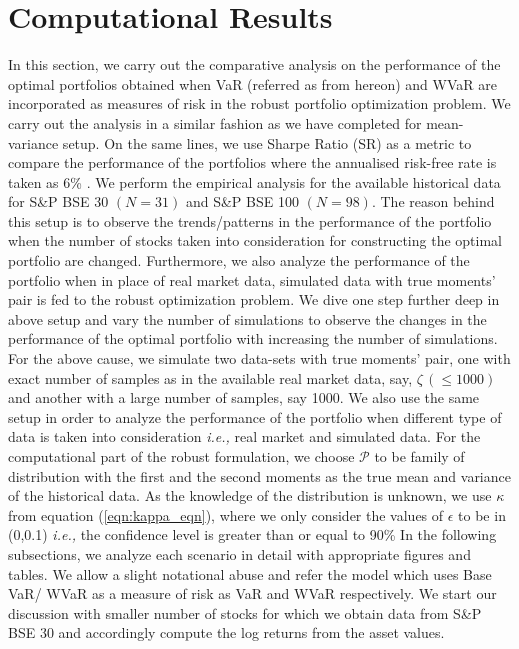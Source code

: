 \section{Computational Results}
In this section, we carry out the comparative analysis on the performance of the optimal portfolios obtained when VaR (referred as  from hereon) and WVaR are incorporated as measures of risk in the robust portfolio optimization problem. We carry out the analysis in a similar fashion as we have completed for mean-variance setup. On the same lines, we use Sharpe Ratio (SR) as a metric to compare the performance of the portfolios where the annualised risk-free rate is taken as 6\% \cite{rbi}. We perform the empirical analysis for the available historical data for S\&P BSE 30 $(N = 31)$ and S\&P BSE 100 $(N = 98)$. The reason behind this setup is to observe the trends/patterns in the performance of the portfolio when the number of stocks taken into consideration for constructing the optimal portfolio are changed. Furthermore, we also analyze the performance of the portfolio when in place of real market data, simulated data with true moments' pair is fed to the robust optimization problem. We dive one step further deep in above setup and vary the number of simulations to observe the changes in the performance of the optimal portfolio with increasing the number of simulations. For the above cause, we simulate two data-sets with true moments' pair, one with exact number of samples as in the available real market data, say, $\zeta \, (\leq 1000)$ and another with a large number of samples, say 1000. We also use the same setup in order to analyze the performance of the portfolio when different type of data is taken into consideration \textit{i.e.,} real market and simulated data. For the computational part of the robust formulation, we choose $\mathcal{P}$ to be family of distribution with the first and the second moments as the true mean and variance of the historical data. As the knowledge of the distribution is unknown, we use $\kappa$ from equation (\ref{eqn:kappa_eqn}), where we only consider the values of $\epsilon$ to be in (0,0.1) \textit{i.e.,} the confidence level is greater than or equal to 90\% In the following subsections, we analyze each scenario in detail with appropriate figures and tables. We allow a slight notational abuse and refer the model which uses Base VaR/ WVaR as a measure of risk as VaR and WVaR respectively. We start our discussion with smaller number of stocks for which we obtain data from S\&P BSE 30 and accordingly compute the log returns from the asset values.


